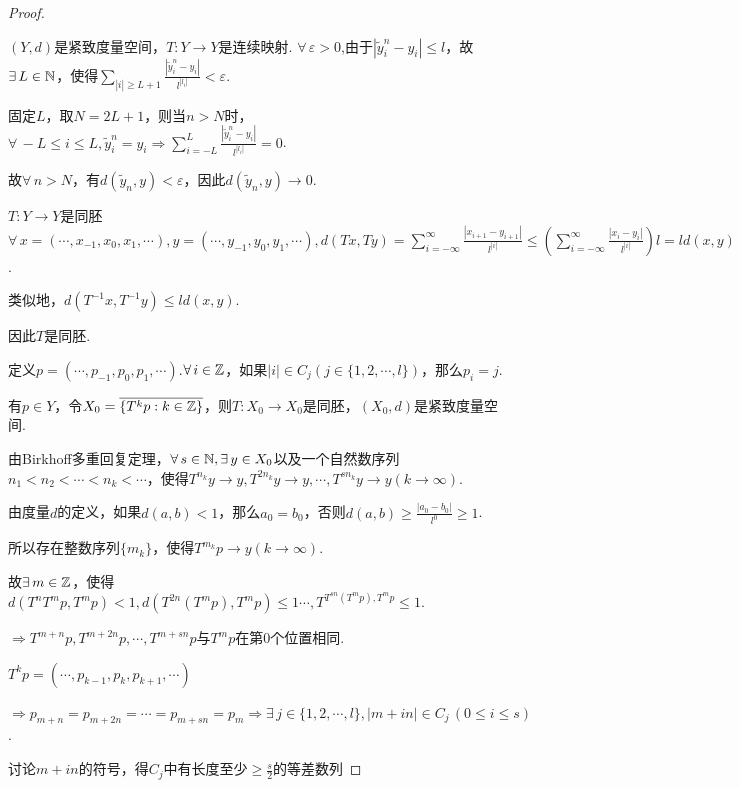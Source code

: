 \begin{proof}
\begin{claim}{$(Y,d)$是紧致度量空间，$T:Y\to Y$是连续映射.}
        $\forall\,\varepsilon>0$,由于$\left|\tilde{y}_i^n-y_i\right|\leq l$，故$\exists\, L\in\mathbb{N}$，使得$\sum_{|i|\geq L+1}{\frac{\left|\tilde{y}_i^n-y_i\right|}{l^{|l_i|}}}<\varepsilon$.\par
        固定$L$，取$N=2L+1$，则当$n>N$时，$\forall\, -L\leq i\leq L,\tilde{y}_i^n=y_i\Rightarrow \sum_{i=-L}^L{\frac{\left|\tilde{y}_i^n-y_i\right|}{l^{|l_i|}}}=0$.\par
        故$\forall\, n>N$，有$d(\tilde{y}_n,y)<\varepsilon$，因此$d(\tilde{y}_n,y)\to 0$.
    \end{claim}\par
    \begin{claim}{$T:Y\to Y$是同胚}
        $\forall\, x=(\cdots,x_{-1},x_0,x_1,\cdots),y=(\cdots,y_{-1},y_0,y_1,\cdots),d \left(Tx,Ty\right)=\sum_{i=-\infty}^\infty{\frac{|x_{i+1}-y_{i+1}|}{l^{|i|}}}\leq \left(\sum_{i=-\infty}^\infty{\frac{|x_{i}-y_{i}|}{l^{|i|}}}\right)l=ld(x,y)$.\par
        类似地，$d \left(T^{-1}x,T^{-1}y\right)\leq ld(x,y)$.\par
        因此$T$是同胚.
    \end{claim}\par
    定义$p=(\cdots,p_{-1},p_0,p_1,\cdots)$.$\forall\,i\in\mathbb{Z}$，如果$|i|\in C_j(j\in\{1,2,\cdots,l\})$，那么$p_i=j$.\par
    有$p\in Y$，令$X_0=\overline{\left\{T^kp:k\in\mathbb{Z}\right\}}$，则$T:X_0\to X_0$是同胚，$(X_0,d)$是紧致度量空间.\par
    由Birkhoff多重回复定理，$\forall\, s\in\mathbb{N},\exists\,y\in X_0$以及一个自然数序列$n_1<n_2<\cdots<n_k<\cdots$，使得$T^{n_k}y\to y,T^{2n_k}y\to y,\cdots,T^{sn_k}y\to y(k\to\infty)$.\par
    由度量$d$的定义，如果$d(a,b)<1$，那么$a_0=b_0$，否则$d(a,b)\geq\frac{|a_0-b_0|}{l^0}\geq 1$.\par
    所以存在整数序列$\{m_k\}$，使得$T^{m_k}p\to y(k\to\infty)$.\par
    故$\exists\,m\in\mathbb{Z}$，使得$d \left(T^nT^mp,T^mp\right)<1,d(T^{2n}(T^mp),T^mp)\leq 1\cdots,T^{T^{sn}\left(T^mp\right),T^mp}\leq 1$.\par
    $\Rightarrow T^{m+n}p,T^{m+2n}p,\cdots,T^{m+sn}p$与$T^mp$在第0个位置相同.\par
    $T^kp=\left(\cdots,p_{k-1},p_k,p_{k+1},\cdots\right)$\par
    $\Rightarrow p_{m+n}=p_{m+2n}=\cdots=p_{m+sn}=p_m\Rightarrow \exists\,j\in\{1,2,\cdots,l\},|m+in|\in C_j\,(0\leq i\leq s)$.\par
    讨论$m+in$的符号，得$C_j$中有长度至少$\geq\frac{s}{2}$的等差数列
\end{proof}






